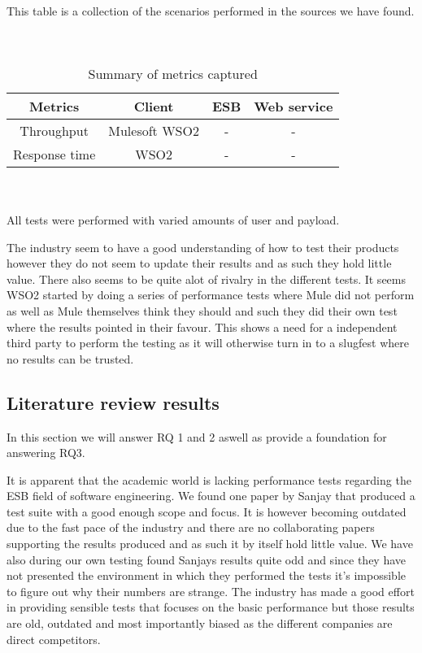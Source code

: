\begin{table}[H]
	This table is a collection of the scenarios performed in the sources we have found. 
	\\
	\\
	\\	
	\caption{Summary of metrics captured}
	\begin{tabular}{c c c c}
	Metrics &  Client & ESB & Web service \\
	\hline
	Throughput & Mulesoft \cite{mulesoft08} WSO2 \cite{Perera07R2,Perera07R3} & - & - \\
	Response time & WSO2 \cite{Perera07} & - & - \\
	\hline
	\end{tabular}
	\\
	\\
	All tests were performed with varied amounts of user and payload.
\end{table}

The industry seem to have a good understanding of how to test their products however they do not seem to update their results and as such they hold little value.
There also seems to be quite alot of rivalry in the different tests. 
It seems WSO2 started by doing a series of performance tests \cite{Perera07,Perera07R2,Perera07R3}  where Mule did not perform as well as Mule themselves think they should and such they did their own test \cite{mulesoft08} where the results pointed in their favour.
This shows a need for a independent third party to perform the testing as it will otherwise turn in to a slugfest where no results can be trusted. 

\subsection{Literature review results}
\label{sec:litrev_results}
In this section we will answer RQ 1 and 2 aswell as provide a foundation for answering RQ3.

It is apparent that the academic world is lacking performance tests regarding the ESB field of software engineering. 
We found one paper by Sanjay \cite{Sanjay2011} that produced a test suite with a good enough scope and focus. 
It is however becoming outdated due to the fast pace of the industry and there are no collaborating papers supporting the results produced and as such it by itself hold little value. 
We have also during our own testing found Sanjays results quite odd and since they have not presented the environment in which they performed the tests it's impossible to figure out why their numbers are strange. 
The industry has made a good effort in providing sensible tests that focuses on the basic performance but those results are old, outdated and most importantly biased as the different companies are direct competitors. 

